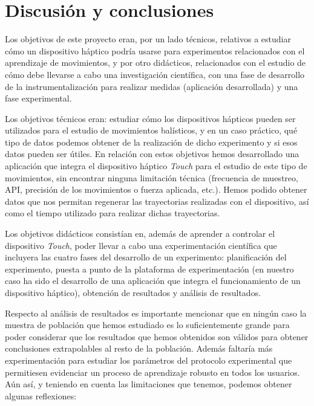 \documentclass[a4paper,11pt, oneside]{book}
\begin{document}
\chapter{Discusión y conclusiones}

Los objetivos de este proyecto eran, por un lado técnicos, relativos a estudiar cómo un dispositivo háptico podría usarse para experimentos relacionados con el aprendizaje de movimientos, y por otro didácticos, relacionados con el estudio de cómo debe llevarse a cabo una investigación científica, con una fase de desarrollo de la instrumentalización para realizar medidas (aplicación desarrollada) y una fase experimental.


Los objetivos técnicos eran: estudiar cómo los dispositivos hápticos pueden ser utilizados para el estudio de movimientos balísticos, y en un caso práctico, qué tipo de datos podemos obtener de la realización de dicho experimento y si esos datos pueden ser útiles. En relación con estos objetivos hemos desarrollado una aplicación que integra el dispositivo háptico \textit{Touch} para el estudio de este tipo de movimientos, sin encontrar ninguna limitación técnica (frecuencia de muestreo, API, precisión de los movimientos o fuerza aplicada, etc.). Hemos podido obtener datos que nos permitan regenerar las trayectorias realizadas con el dispositivo, así como el tiempo utilizado para 
realizar dichas trayectorias. 


Los objetivos didácticos consistían en, además de aprender a controlar el dispositivo \textit{Touch}, poder llevar a cabo una experimentación científica que incluyera las cuatro fases del desarrollo de un experimento: planificación del experimento, puesta a punto de la plataforma de experimentación (en nuestro caso ha sido el desarrollo de una aplicación que integra el funcionamiento de un dispositivo háptico), obtención de resultados y análisis de resultados.

Respecto al análisis de resultados es importante mencionar que en ningún caso la muestra de población que hemos estudiado es lo suficientemente grande para poder considerar que los resultados que hemos obtenidos son válidos para obtener conclusiones extrapolables al resto de la población. Además faltaría más experimentación para estudiar los parámetros del protocolo experimental que permitiesen evidenciar un proceso de aprendizaje robusto en todos los usuarios. Aún así, y teniendo en cuenta las limitaciones que tenemos, podemos obtener algunas reflexiones:
\end{document}
